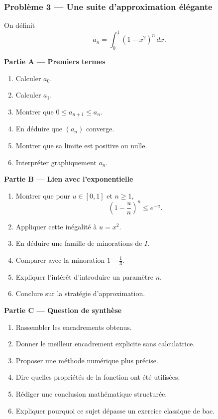 \documentclass[11pt,a4paper]{article}
\begin{document}
\begin{difficile}
\subsubsection*{Problème 3 — Une suite d'approximation élégante}

On définit
\[
a_n=\int_0^1 (1-x^2)^n\,dx.
\]

\textbf{Partie A — Premiers termes}
\begin{enumerate}
  \item Calculer $a_0$.
  \item Calculer $a_1$.
  \item Montrer que $0\leq a_{n+1}\leq a_n$.
  \item En déduire que $(a_n)$ converge.
  \item Montrer que sa limite est positive ou nulle.
  \item Interpréter graphiquement $a_n$.
\end{enumerate}

\textbf{Partie B — Lien avec l'exponentielle}
\begin{enumerate}
  \item Montrer que pour $u\in[0,1]$ et $n\geq1$,
  \[
  \left(1-\frac{u}{n}\right)^n\leq e^{-u}.
  \]
  \item Appliquer cette inégalité à $u=x^2$.
  \item En déduire une famille de minorations de $I$.
  \item Comparer avec la minoration $1-\frac13$.
  \item Expliquer l'intérêt d'introduire un paramètre $n$.
  \item Conclure sur la stratégie d'approximation.
\end{enumerate}

\textbf{Partie C — Question de synthèse}
\begin{enumerate}
  \item Rassembler les encadrements obtenus.
  \item Donner le meilleur encadrement explicite sans calculatrice.
  \item Proposer une méthode numérique plus précise.
  \item Dire quelles propriétés de la fonction ont été utilisées.
  \item Rédiger une conclusion mathématique structurée.
  \item Expliquer pourquoi ce sujet dépasse un exercice classique de bac.
\end{enumerate}
\end{difficile}
\end{document}
